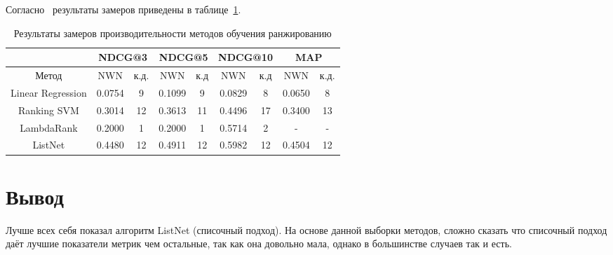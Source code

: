 Согласно~\cite{cmp} результаты замеров приведены в таблице~\ref{tbl:measure}.

\begin{table}[h]
	\begin{center}
		\begin{threeparttable}
			\captionsetup{justification=raggedright,singlelinecheck=off}
			\caption{Результаты замеров производительности методов обучения ранжированию}
			\label{tbl:measure}
			\begin{tabular}{|c|c|c|c|c|c|c|c|c|}
				\hline
				 & \multicolumn{2}{c|}{NDCG@3} & \multicolumn{2}{c|}{NDCG@5} & \multicolumn{2}{c|}{NDCG@10} & \multicolumn{2}{c|}{MAP} \\\hline
				Метод & NWN  & к.д. & NWN  & к.д & NWN  & к.д & NWN  & к.д. \\\hline
				Linear Regression & 0.0754 & 9 & 0.1099& 9& 0.0829& 8& 0.0650& 8 \\\hline
				Ranking SVM &  0.3014 & 12& 0.3613& 11& 0.4496& 17& 0.3400& 13 \\\hline
				LambdaRank &  0.2000 &1 &0.2000 &1 &0.5714& 2 &-& - \\\hline
				ListNet &  0.4480 &12 &0.4911 &12 &0.5982 &12 &0.4504 &12 \\\hline
			\end{tabular}
		\end{threeparttable}
	\end{center}
\end{table}

\section{Вывод}

Лучше всех себя показал алгоритм ListNet (списочный подход). На основе данной выборки методов, сложно сказать что списочный подход даёт лучшие показатели метрик чем остальные, так как она довольно мала, однако в большинстве случаев так и есть.